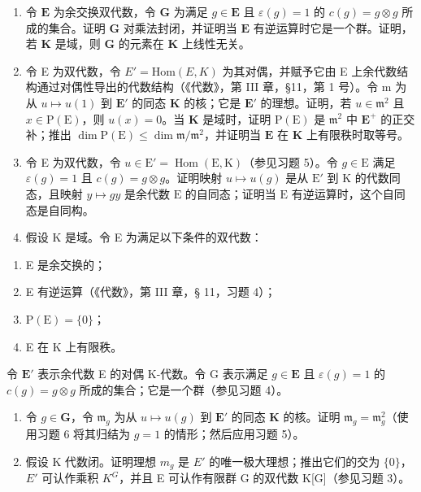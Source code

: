 \begin{enumerate}
\def\labelenumi{\arabic{enumi}.}
\setcounter{enumi}{3}
\item
  令 \(\mathbf{E}\) 为余交换双代数，令 \(\mathbf{G}\) 为满足 \(g \in \mathbf{E}\) 且 \(\varepsilon(g) = 1\) 的 \(c(g) = g \otimes g\) 所成的集合。证明 \(\mathbf{G}\) 对乘法封闭，并证明当 \(\mathbf{E}\) 有逆运算时它是一个群。证明，若 \(\mathbf{K}\) 是域，则 \(\mathbf{G}\) 的元素在 \(\mathbf{K}\) 上线性无关。
\item
  令 E 为双代数，令 \(E' = \text{Hom}(E, K)\) 为其对偶，并赋予它由 E 上余代数结构通过对偶性导出的代数结构（《代数》，第 III 章，§11，第 1 号）。令 m 为从 \(u \mapsto u(1)\) 到 \(\mathbf{E}'\) 的同态 \(\mathbf{K}\) 的核；它是 \(\mathbf{E}'\) 的理想。证明，若 \(u \in \mathfrak{m}^2\) 且 \(x \in \mathrm{P}(\mathrm{E})\)，则 \(u(x) = 0\)。当 \(\mathbf{K}\) 是域时，证明 \(\mathrm{P}(\mathrm{E})\) 是 \(\mathfrak{m}^2\) 中 \(\mathbf{E}^+\) 的正交补；推出 \(\dim \mathrm{P}(\mathrm{E}) \leqslant \dim \mathfrak{m} / \mathfrak{m}^2\)，并证明当 \(\mathbf{E}\) 在 \(\mathbf{K}\) 上有限秩时取等号。
\item
  令 E 为双代数，令 \(u \in \mathrm{E}' = \operatorname{Hom}(\mathrm{E}, \mathrm{K})\)（参见习题 5）。令 \(g \in \mathrm{E}\) 满足 \(\varepsilon(g) = 1\) 且 \(c(g) = g \otimes g\)。证明映射 \(u \mapsto u(g)\) 是从 \(\mathrm{E}'\) 到 \(\mathrm{K}\) 的代数同态，且映射 \(y \mapsto gy\) 是余代数 \(\mathrm{E}\) 的自同态；证明当 \(\mathrm{E}\) 有逆运算时，这个自同态是自同构。
\item
  假设 K 是域。令 E 为满足以下条件的双代数：
\end{enumerate}

\begin{enumerate}
\def\labelenumi{(\roman{enumi})}
\item
  E 是余交换的；
\item
  E 有逆运算（《代数》，第 III 章，§ 11，习题 4）；
\item
  \(\mathrm{P(E)} = \{0\}\)；
\item
  E 在 K 上有限秩。
\end{enumerate}

令 \(\mathbf{E}'\) 表示余代数 E 的对偶 K-代数。令 G 表示满足 \(g \in \mathbf{E}\) 且 \(\varepsilon(g) = 1\) 的 \(c(g) = g \otimes g\) 所成的集合；它是一个群（参见习题 4）。

\begin{enumerate}
\def\labelenumi{(\alph{enumi})}
\item
  令 \(g \in \mathbf{G}\)，令 \(\mathfrak{m}_g\) 为从 \(u \mapsto u(g)\) 到 \(\mathbf{E}'\) 的同态 \(\mathbf{K}\) 的核。证明 \(\mathfrak{m}_g = \mathfrak{m}_g^2\)（使用习题 6 将其归结为 \(g = 1\) 的情形；然后应用习题 5）。
\item
  假设 K 代数闭。证明理想 \(m_{g}\) 是 \(E'\) 的唯一极大理想；推出它们的交为 \(\{0\}\)，\(E'\) 可认作乘积 \(K^{G}\)，并且 E 可认作有限群 G 的双代数 K[G]（参见习题 3）。
\end{enumerate}

